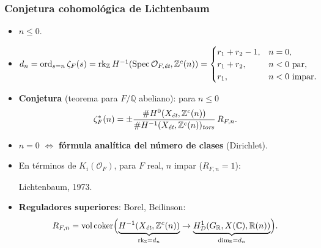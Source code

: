 \documentclass[handout]{beamer}
\newcommand{\CC}{\mathbb{C}}
\newcommand{\FF}{\mathbb{F}}
\newcommand{\PP}{\mathbb{P}}
\newcommand{\QQ}{\mathbb{Q}}
\newcommand{\RR}{\mathbb{R}}
\newcommand{\ZZ}{\mathbb{Z}}
\DeclareMathOperator{\coker}{coker}
\DeclareMathOperator{\ord}{ord}
\DeclareMathOperator{\rk}{rk}
\DeclareMathOperator{\Spec}{Spec}
\DeclareMathOperator{\vol}{vol}
\newcommand{\et}{\text{\it ét}}
\newcommand{\tors}{\text{\it tors}}
\begin{document}
\begin{frame}
  \frametitle{Conjetura cohomológica de Lichtenbaum}

  \begin{itemize}
  \item<2-> $n \le 0$.

  \item<3-> $d_n = \ord_{s = n} \zeta_F (s) =
    \rk_\ZZ H^{-1} (\Spec \mathcal{O}_{F,\et}, \ZZ^c (n)) =
    \begin{cases}
      r_1 + r_2 - 1, & n = 0, \\
      r_1 + r_2, & n < 0\text{ par}, \\
      r_1, & n < 0\text{ impar}.
    \end{cases}$

  \item<4-> \textbf{Conjetura} (teorema para $F/\QQ$ abeliano): para $n \le 0$
    \[ \zeta_F^* (n) = \pm\frac{\# H^0 (X_\et, \ZZ^c (n))}{\# H^{-1} (X_\et, \ZZ^c (n))_\tors}\,R_{F,n}. \]

  \item<5-> $n = 0$ $\Longleftrightarrow$ \textbf{fórmula analítica del número de clases} (Dirichlet).
 
  \item<6-> En términos de $K_i (\mathcal{O}_F)$, para $F$ real, $n$ impar
    ($R_{F,n} = 1$):

    Lichtenbaum, 1973.

  \item<7-> \textbf{Reguladores superiores}: Borel, Beilinson:
    \[ R_{F,n} = \vol\coker \Bigl(\underbrace{H^{-1} (X_\et, \ZZ^c(n))}_{\rk_\ZZ = d_n} \to \underbrace{H^1_\mathcal{D} (G_\RR, X(\CC), \RR(n))}_{\dim_\RR = d_n}\Bigr). \]
  \end{itemize}
\end{frame}


\iffalse
\begin{frame}
  \frametitle{Caso de curvas}

  \begin{itemize}
  \item $X = C/\FF_q$ cualquier curva.

  \item $\ord_{s = n} \zeta (X,s) = 0$ para $n < 0$.

  \item $\zeta (X,n) = \pm \frac{|H^0 (X_\et, \ZZ^c (n))|}{|H^{-1} (X_\et, \ZZ^c (n))| \cdot |H^1 (X_\et, \ZZ^c (n))|}$.

  \item Ejemplo singular: cúbica nodal $X = \PP^1_{\FF_q} / (0\sim 1)$.

    \begin{align*}
      H^{-1} (X_\et, \ZZ^c (n)) & = \ZZ/(q^{1-n} - 1), \\
      H^{0,1} (X_\et, \ZZ^c (n)) & = \ZZ/(q^{-n} - 1).
    \end{align*}

    \[ \zeta (X,s) = \frac{1}{1 - q^{1-s}}. \]
  \end{itemize}
\end{frame}
\fi
\end{document}
